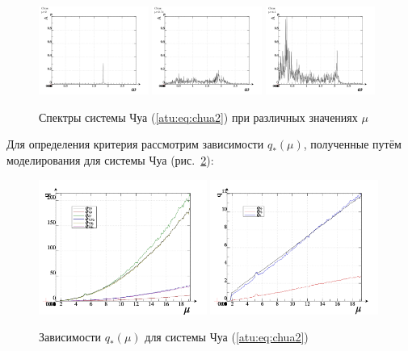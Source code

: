 \documentclass[a4paper,12pt]{article}
\begin{document}
\begin{figure}[htb!]
\centerline{
  \includegraphics[width=0.32\textwidth]{p/cha/chua/chua_f-p_f_mu=2x00.png}
  \includegraphics[width=0.32\textwidth]{p/cha/chua/chua_f-p_f_mu=2x74.png}
  \includegraphics[width=0.32\textwidth]{p/cha/chua/chua_f-p_f_mu=4x50.png}
}
\caption{Спектры системы Чуа (\ref{atu:eq:chua2}) при различных значениях $\mu$}
\label{atu:f:chua_spectrum}
\end{figure}

Для определения критерия рассмотрим зависимости
$q_{*}(\mu) $, полученные путём моделирования
для системы Чуа (рис.~\ref{atu:f:chua_q}):

\begin{figure}[htb!]
\centerline{
  \includegraphics[width=0.49\textwidth]{p/cha/chua/chua_q-p_mu2.png}
  \includegraphics[width=0.49\textwidth]{p/cha/chua/chua_q-p_mu1.png}
}
  \caption{Зависимости $q_{*}(\mu) $ для системы Чуа (\ref{atu:eq:chua2})}
\label{atu:f:chua_q}
\end{figure}
\end{document}
